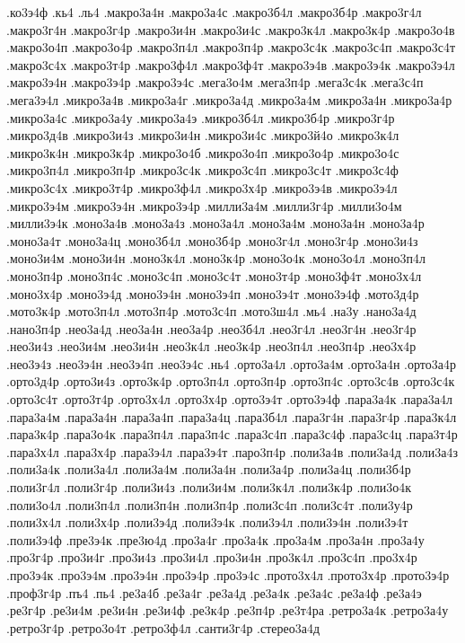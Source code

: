 {.ко3э4ф
.кь4
.ль4
.макро3а4н
.макро3а4с
.макро3б4л
.макро3б4р
.макро3г4л
.макро3г4н
.макро3г4р
.макро3и4н
.макро3и4с
.макро3к4л
.макро3к4р
.макро3о4в
.макро3о4п
.макро3о4р
.макро3п4л
.макро3п4р
.макро3с4к
.макро3с4п
.макро3с4т
.макро3с4х
.макро3т4р
.макро3ф4л
.макро3ф4т
.макро3э4в
.макро3э4к
.макро3э4л
.макро3э4н
.макро3э4р
.макро3э4с
.мега3о4м
.мега3п4р
.мега3с4к
.мега3с4п
.мега3э4л
.микро3а4в
.микро3а4г
.микро3а4д
.микро3а4м
.микро3а4н
.микро3а4р
.микро3а4с
.микро3а4у
.микро3а4э
.микро3б4л
.микро3б4р
.микро3г4р
.микро3д4в
.микро3и4з
.микро3и4н
.микро3и4с
.микро3й4о
.микро3к4л
.микро3к4н
.микро3к4р
.микро3о4б
.микро3о4п
.микро3о4р
.микро3о4с
.микро3п4л
.микро3п4р
.микро3с4к
.микро3с4п
.микро3с4т
.микро3с4ф
.микро3с4х
.микро3т4р
.микро3ф4л
.микро3х4р
.микро3э4в
.микро3э4л
.микро3э4м
.микро3э4н
.микро3э4р
.милли3а4м
.милли3г4р
.милли3о4м
.милли3э4к
.моно3а4в
.моно3а4з
.моно3а4л
.моно3а4м
.моно3а4н
.моно3а4р
.моно3а4т
.моно3а4ц
.моно3б4л
.моно3б4р
.моно3г4л
.моно3г4р
.моно3и4з
.моно3и4м
.моно3и4н
.моно3к4л
.моно3к4р
.моно3о4к
.моно3о4л
.моно3п4л
.моно3п4р
.моно3п4с
.моно3с4п
.моно3с4т
.моно3т4р
.моно3ф4т
.моно3х4л
.моно3х4р
.моно3э4д
.моно3э4н
.моно3э4п
.моно3э4т
.моно3э4ф
.мото3д4р
.мото3к4р
.мото3п4л
.мото3п4р
.мото3с4п
.мото3ш4л
.мь4
.на3у
.нано3а4д
.нано3п4р
.нео3а4д
.нео3а4н
.нео3а4р
.нео3б4л
.нео3г4л
.нео3г4н
.нео3г4р
.нео3и4з
.нео3и4м
.нео3и4н
.нео3к4л
.нео3к4р
.нео3п4л
.нео3п4р
.нео3х4р
.нео3э4з
.нео3э4н
.нео3э4п
.нео3э4с
.нь4
.орто3а4л
.орто3а4м
.орто3а4н
.орто3а4р
.орто3д4р
.орто3и4з
.орто3к4р
.орто3п4л
.орто3п4р
.орто3п4с
.орто3с4в
.орто3с4к
.орто3с4т
.орто3т4р
.орто3х4л
.орто3х4р
.орто3э4т
.орто3э4ф
.пара3а4к
.пара3а4л
.пара3а4м
.пара3а4н
.пара3а4п
.пара3а4ц
.пара3б4л
.пара3г4н
.пара3г4р
.пара3к4л
.пара3к4р
.пара3о4к
.пара3п4л
.пара3п4с
.пара3с4п
.пара3с4ф
.пара3с4ц
.пара3т4р
.пара3х4л
.пара3х4р
.пара3э4л
.пара3э4т
.паро3п4р
.поли3а4в
.поли3а4д
.поли3а4з
.поли3а4к
.поли3а4л
.поли3а4м
.поли3а4н
.поли3а4р
.поли3а4ц
.поли3б4р
.поли3г4л
.поли3г4р
.поли3и4з
.поли3и4м
.поли3к4л
.поли3к4р
.поли3о4к
.поли3о4л
.поли3п4л
.поли3п4н
.поли3п4р
.поли3с4п
.поли3с4т
.поли3у4р
.поли3х4л
.поли3х4р
.поли3э4д
.поли3э4к
.поли3э4л
.поли3э4н
.поли3э4т
.поли3э4ф
.пре3э4к
.пре3ю4д
.про3а4г
.про3а4к
.про3а4м
.про3а4н
.про3а4у
.про3г4р
.про3и4г
.про3и4з
.про3и4л
.про3и4н
.про3к4л
.про3с4п
.про3х4р
.про3э4к
.про3э4м
.про3э4н
.про3э4р
.про3э4с
.прото3х4л
.прото3х4р
.прото3э4р
.проф3г4р
.пъ4
.пь4
.ре3а4б
.ре3а4г
.ре3а4д
.ре3а4к
.ре3а4с
.ре3а4ф
.ре3а4э
.ре3г4р
.ре3и4м
.ре3и4н
.ре3и4ф
.ре3к4р
.ре3п4р
.ре3т4ра
.ретро3а4к
.ретро3а4у
.ретро3г4р
.ретро3о4т
.ретро3ф4л
.санти3г4р
.стерео3а4д
}

